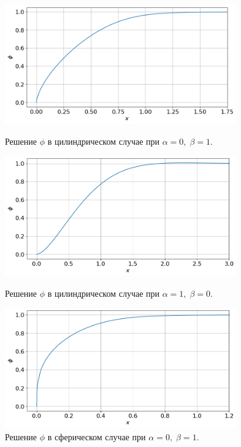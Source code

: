 \begin{figure}[!tp]
	\centering
	\includegraphics[width=0.89\textwidth]{figures/result_volumes_cyl_p.png}
	\vspace{-0.3cm}
	\caption{Решение $\phi$ в цилиндрическом случае при $\alpha = 0, \; \beta = 1$.}
	\label{fig:result_volumes_cyl_p}
	\vspace{0.5cm}

	\includegraphics[width=0.89\textwidth]{figures/result_volumes_cyl_bi.png}
	\vspace{-0.3cm}
	\caption{Решение $\phi$ в цилиндрическом случае при $\alpha = 1, \; \beta = 0$.}
	\label{fig:result_volumes_cyl_bi}
	\vspace{0.5cm}
	
	\includegraphics[width=0.89\textwidth]{figures/result_volumes_sph_p.png}
	\vspace{-0.3cm}
	\caption{Решение $\phi$ в сферическом случае при $\alpha = 0, \; \beta = 1$.}
	\label{fig:result_volumes_sph_p}
\end{figure}

